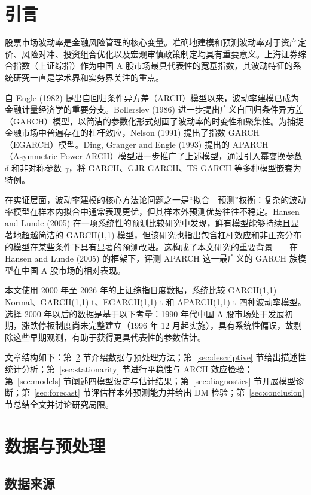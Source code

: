 \documentclass[12pt,a4paper]{article}
\begin{document}
\section{引言}

股票市场波动率是金融风险管理的核心变量。准确地建模和预测波动率对于资产定价、风险对冲、投资组合优化以及宏观审慎政策制定均具有重要意义。上海证券综合指数（上证综指）作为中国 A 股市场最具代表性的宽基指数，其波动特征的系统研究一直是学术界和实务界关注的重点。

自 Engle (1982) 提出自回归条件异方差（ARCH）模型以来，波动率建模已成为金融计量经济学的重要分支。Bollerslev (1986) 进一步提出广义自回归条件异方差（GARCH）模型，以简洁的参数化形式刻画了波动率的时变性和聚集性。为捕捉金融市场中普遍存在的杠杆效应，Nelson (1991) 提出了指数 GARCH（EGARCH）模型。Ding, Granger and Engle (1993) 提出的 APARCH（Asymmetric Power ARCH）模型进一步推广了上述模型，通过引入幂变换参数 $\delta$ 和非对称参数 $\gamma$，将 GARCH、GJR-GARCH、TS-GARCH 等多种模型嵌套为特例。

在实证层面，波动率建模的核心方法论问题之一是``拟合—预测''权衡：复杂的波动率模型在样本内拟合中通常表现更优，但其样本外预测优势往往不稳定。Hansen and Lunde (2005) 在一项系统性的预测比较研究中发现，鲜有模型能够持续且显著地超越简洁的 GARCH(1,1) 模型，但该研究也指出包含杠杆效应和非正态分布的模型在某些条件下具有显著的预测改进。这构成了本文研究的重要背景——在 Hansen and Lunde (2005) 的框架下，评测 APARCH 这一最广义的 GARCH 族模型在中国 A 股市场的相对表现。

本文使用 2000 年至 2026 年的上证综指日度数据，系统比较 GARCH(1,1)-Normal、GARCH(1,1)-t、EGARCH(1,1)-t 和 APARCH(1,1)-t 四种波动率模型。选择 2000 年以后的数据是基于以下考量：1990 年代中国 A 股市场处于发展初期，涨跌停板制度尚未完整建立（1996 年 12 月起实施），具有系统性偏误，故剔除这些早期观测，有助于获得更具代表性的参数估计。

文章结构如下：第~\ref{sec:data} 节介绍数据与预处理方法；第~\ref{sec:descriptive} 节给出描述性统计分析；第~\ref{sec:stationarity} 节进行平稳性与 ARCH 效应检验；第~\ref{sec:models} 节阐述四模型设定与估计结果；第~\ref{sec:diagnostics} 节开展模型诊断；第~\ref{sec:forecast} 节评估样本外预测能力并给出 DM 检验；第~\ref{sec:conclusion} 节总结全文并讨论研究局限。

\section{数据与预处理}\label{sec:data}

\subsection{数据来源}
\end{document}
